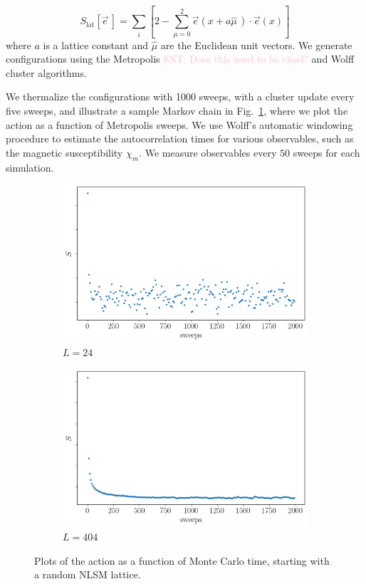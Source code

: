 \documentclass[a4paper,11pt]{article}
\newcommand{\e}{\vec e}
\newcommand\stuart[1]{\textcolor{pink}{SNT: #1}}
\begin{document}
\begin{equation}
    \label{eq:nlsm discretized action}
    S_\mathrm{lat}[\e\,] = \sum_i \left[ 2 - \sum_{\mu=0}^{2}\e(x+a\hat{\mu}\,)\cdot\e(x)  \right]
\end{equation}
where $a$ is a lattice constant and $\hat \mu$ are the Euclidean unit vectors. We generate configurations using the Metropolis \stuart{Does this need to be cited?} and Wolff cluster \cite{wolff1989} algorithms.

We thermalize the configurations with 1000 sweeps, with a cluster update every five sweeps, and illustrate a sample Markov chain in Fig.~\ref{fig:therm}, where we plot the action as a function of Metropolis sweeps. We use Wolff's automatic windowing procedure \cite{wolff2007} to estimate the autocorrelation times for various observables, such as the magnetic susceptibility $\chi_m$. We measure observables every $50$ sweeps for each simulation.
\begin{figure}[h]
  \centering
      \begin{subfigure}[b]{0.5\textwidth}\centering
        \includegraphics[width=\textwidth]{therm24.png}
        \caption{$L=24$}
      \end{subfigure}%
      \hfill
      \begin{subfigure}[b]{0.5\textwidth}\centering
        \includegraphics[width=\textwidth]{therm404.png}
        \caption{$L=404$}
      \end{subfigure}
      \hfill
      \caption{\label{fig:therm} Plots of the action as a function of Monte Carlo time, starting with a random NLSM lattice.}
\end{figure}
\end{document}

